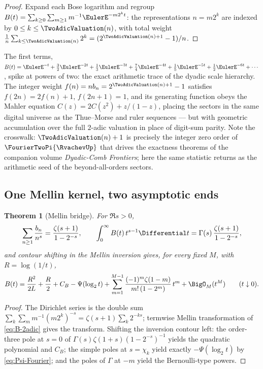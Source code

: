 \documentclass[11pt,oneside]{article}
\numberwithin{equation}{section}
\newtheorem{theorem}{Theorem}[section]
\theoremstyle{definition}
\theoremstyle{remark}
\newcommand{\CB}{C_{B}}
\begin{document}
\begin{proof}
Expand each Bose logarithm and regroup
$B(t)=\sum_{k\ge0}\sum_{m\ge1}m^{-1}\EulerE^{-m2^{k}t}$: the
representations $n=m2^{k}$ are indexed by $0\le k\le\TwoAdicValuation(n)$, with
total weight
$\tfrac1n\sum_{k\le\TwoAdicValuation(n)}2^{k}=(2^{\TwoAdicValuation(n)+1}-1)/n$.
\end{proof}

The first terms,
$B(t)=\EulerE^{-t}+\tfrac32\EulerE^{-2t}+\tfrac13\EulerE^{-3t}
+\tfrac74\EulerE^{-4t}+\tfrac15\EulerE^{-5t}+\tfrac12\EulerE^{-6t}+\cdots$, spike at
powers of two: the exact arithmetic trace of the dyadic scale
hierarchy.  The integer weight $f(n)=nb_n=2^{\TwoAdicValuation(n)+1}-1$
satisfies $f(2n)=2f(n)+1$, $f(2n+1)=1$, and its generating function
obeys the Mahler equation $C(z)=2C(z^{2})+z/(1-z)$, placing the
sectors in the same digital universe as the Thue--Morse and ruler
sequences --- but with geometric accumulation over the full
$2$-adic valuation in place of digit-sum parity.  Note the
crosswalk: $\TwoAdicValuation(n)+1$ is precisely the integer zero order of
$\FourierTwoPi{\RvachevUp}$ that drives the exactness theorems of the companion
volume \emph{Dyadic-Comb Frontiers}; here the same statistic returns
as the arithmetic seed of the beyond-all-orders sectors.

\subsection{One Mellin kernel, two asymptotic ends}

\begin{theorem}[Mellin bridge]
\label{thm:mellin-bridge}
For $\Re s>0$,
\begin{equation}
 \sum_{n\ge1}\frac{b_n}{n^{s}}
 =\frac{\zeta(s+1)}{1-2^{-s}},
 \qquad
 \int_0^\infty B(t)\,t^{s-1}\Differential t
 =\Gamma(s)\,\frac{\zeta(s+1)}{1-2^{-s}},
 \label{eq:mellin}
\end{equation}
and contour shifting in the Mellin inversion gives, for every fixed
$M$, with $R=\log(1/t)$,
\begin{equation}
 B(t)=\frac{R^{2}}{2L}+\frac R2+\CB-\Psi(\log_2t)
 +\sum_{m=1}^{M-1}\frac{(-1)^{m}\zeta(1-m)}{m!\,(1-2^{m})}\,t^{m}
 +\BigO_M(t^{M})
 \qquad(t\downarrow0).
 \label{eq:B-small-t}
\end{equation}
\end{theorem}

\begin{proof}
The Dirichlet series is the double sum
$\sum_{k}\sum_{m}m^{-1}(m2^{k})^{-s}
=\zeta(s+1)\sum_k2^{-ks}$; termwise Mellin transformation of
\eqref{eq:B-2adic} gives the transform.  Shifting the inversion
contour left: the order-three pole at $s=0$ of
$\Gamma(s)\zeta(1+s)(1-2^{-s})^{-1}$ yields the quadratic polynomial
and $\CB$; the simple poles at $s=\chi_k$ yield exactly
$-\Psi(\log_2t)$ by \eqref{eq:Psi-Fourier}; and the poles of
$\Gamma$ at $-m$ yield the Bernoulli-type powers.
\end{proof}
\end{document}
